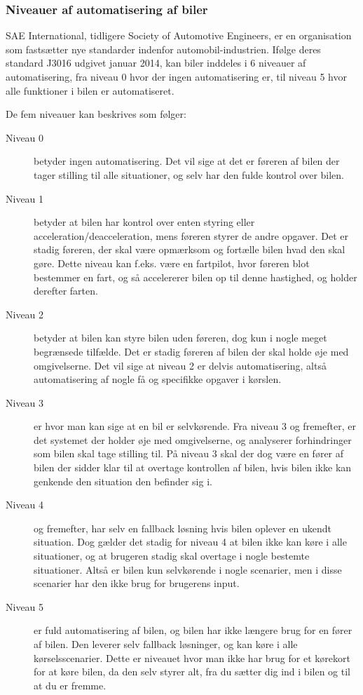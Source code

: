 \subsubsection{Niveauer af automatisering af biler}
SAE International, tidligere Society of Automotive Engineers, er en organisation som fastsætter nye standarder indenfor automobil-industrien. Ifølge deres standard J3016 udgivet januar 2014, kan biler inddeles i 6 niveauer af automatisering, fra niveau 0 hvor der ingen automatisering er, til niveau 5 hvor alle funktioner i bilen er automatiseret\cite{SAE_J3016}. 

De fem niveauer kan beskrives som følger:

\begin{description}
	\item[Niveau 0] betyder ingen automatisering. Det vil sige at det er føreren af bilen der tager stilling til alle situationer, og selv har den fulde kontrol over bilen.
	\item[Niveau 1] betyder at bilen har kontrol over enten styring eller acceleration/deacceleration, mens føreren styrer de andre opgaver. Det er stadig føreren, der skal være opmærksom og fortælle bilen hvad den skal gøre. Dette niveau kan f.eks. være en fartpilot, hvor føreren blot bestemmer en fart, og så accelererer bilen op til denne hastighed, og holder derefter farten. 
	\item[Niveau 2] betyder at bilen kan styre bilen uden føreren, dog kun i nogle meget begrænsede tilfælde. Det er stadig føreren af bilen der skal holde øje med omgivelserne. Det vil sige at niveau 2 er delvis automatisering, altså automatisering af nogle få og specifikke opgaver i kørslen.
	\item[Niveau 3] er hvor man kan sige at en bil er selvkørende. Fra niveau 3 og fremefter, er det systemet der holder øje med omgivelserne, og analyserer forhindringer som bilen skal tage stilling til. På niveau 3 skal der dog være en fører af bilen der sidder klar til at overtage kontrollen af bilen, hvis bilen ikke kan genkende den situation den befinder sig i.
	\item[Niveau 4] og fremefter, har selv en fallback løsning hvis bilen oplever en ukendt situation. Dog gælder det stadig for niveau 4 at bilen ikke kan køre i alle situationer, og at brugeren stadig skal overtage i nogle bestemte situationer. Altså er bilen kun selvkørende i nogle scenarier, men i disse scenarier har den ikke brug for brugerens input.
	\item[Niveau 5] er fuld automatisering af bilen, og bilen har ikke længere brug for en fører af bilen. Den leverer selv fallback løsninger, og kan køre i alle kørselsscenarier. Dette er niveauet hvor man ikke har brug for et kørekort for at køre bilen, da den selv styrer alt, fra du sætter dig ind i bilen og til at du er fremme.
\end{description}

